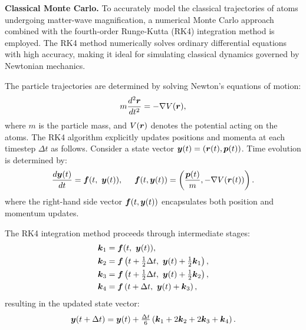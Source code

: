


\textbf{Classical Monte Carlo.} To accurately model the classical trajectories of atoms undergoing matter-wave magnification, a numerical Monte Carlo approach combined with the fourth-order Runge-Kutta (RK4) integration method is employed. The RK4 method numerically solves ordinary differential equations with high accuracy, making it ideal for simulating classical dynamics governed by Newtonian mechanics.



The particle trajectories are determined by solving Newton's equations of motion:
\begin{equation}
m \frac{d^2 \boldsymbol{r}}{dt^2} = -\nabla V(\boldsymbol{r}),
\end{equation}
where $m$ is the particle mass, and $V(\boldsymbol{r})$ denotes the potential acting on the atoms. 
The RK4 algorithm explicitly updates positions and momenta at each timestep $\Delta t$ as follows. Consider a state vector $\boldsymbol{y}(t) = (\boldsymbol{r}(t), \boldsymbol{p}(t))$. Time evolution is determined by:
\begin{equation*}
\frac{d \boldsymbol{y}(t)}{dt} = \boldsymbol{f}(t,\ \boldsymbol{y}(t)),
\hspace{5 mm} 
\boldsymbol{f}(t, \boldsymbol{y}(t)) = \left(\frac{\boldsymbol{p}(t)}{m}, -\nabla V(\boldsymbol{r}(t))\right).
\end{equation*}
where the right-hand side vector $\boldsymbol{f}(t, \boldsymbol{y}(t))$ encapsulates both position and momentum updates. 

The RK4 integration method proceeds through intermediate stages:
\begin{align*}
\boldsymbol{k}_1 &= \boldsymbol{f}(t,\ \boldsymbol{y}(t)), \\
\boldsymbol{k}_2 &= \boldsymbol{f}\left(t + \tfrac{1}{2}\Delta t,\ \boldsymbol{y}(t) + \tfrac{1}{2}\boldsymbol{k}_1\right), \\
\boldsymbol{k}_3 &= \boldsymbol{f}\left(t + \tfrac{1}{2}\Delta t,\ \boldsymbol{y}(t) + \tfrac{1}{2}\boldsymbol{k}_2\right), \\
\boldsymbol{k}_4 &= \boldsymbol{f}\left(t + \Delta t,\ \boldsymbol{y}(t) + \boldsymbol{k}_3\right),
\end{align*}
resulting in the updated state vector:
\begin{equation*}
\boldsymbol{y}(t + \Delta t) = \boldsymbol{y}(t) + \tfrac{\Delta t}{6}\left(\boldsymbol{k}_1 + 2\boldsymbol{k}_2 + 2\boldsymbol{k}_3 + \boldsymbol{k}_4\right).
\end{equation*}

